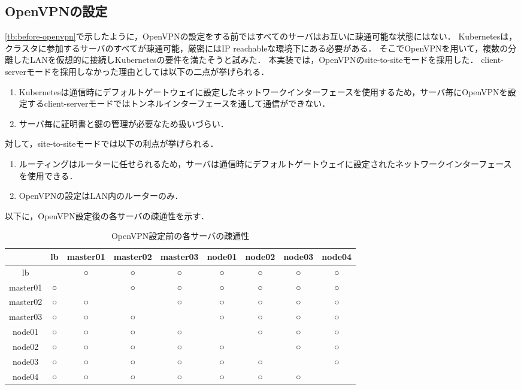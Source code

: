 \subsection{OpenVPNの設定}

\ref{tb:before-openvpn}で示したように，OpenVPNの設定をする前ではすべてのサーバはお互いに疎通可能な状態にはない．
Kubernetesは，クラスタに参加するサーバのすべてが疎通可能，厳密にはIP reachableな環境下にある必要がある．
そこでOpenVPNを用いて，複数の分離したLANを仮想的に接続しKubernetesの要件を満たそうと試みた．
本実装では，OpenVPNのsite-to-siteモードを採用した．
client-serverモードを採用しなかった理由としては以下の二点が挙げられる．

\begin{enumerate}
  \item Kubernetesは通信時にデフォルトゲートウェイに設定したネットワークインターフェースを使用するため，サーバ毎にOpenVPNを設定するclient-serverモードではトンネルインターフェースを通して通信ができない．
  \item サーバ毎に証明書と鍵の管理が必要なため扱いづらい．
\end{enumerate}

対して，site-to-siteモードでは以下の利点が挙げられる．

\begin{enumerate}
  \item ルーティングはルーターに任せられるため，サーバは通信時にデフォルトゲートウェイに設定されたネットワークインターフェースを使用できる．
  \item OpenVPNの設定はLAN内のルーターのみ．
\end{enumerate}

以下に，OpenVPN設定後の各サーバの疎通性を示す．

\begin{table}[htb]
  \begin{center}
    \caption{OpenVPN設定前の各サーバの疎通性}
    \begin{tabular}{|c|c|c|c|c|c|c|c|c|} \hline
      & lb & master01 & master02 & master03 & node01 & node02 & node03 & node04 \\ \hline
      lb & \ & ○ & ○ & ○ & ○ & ○ & ○ & ○ \\ \hline
      master01 & ○ & \ & ○ & ○ & ○ & ○ & ○ & ○ \\ \hline
      master02 & ○ & ○ & \ & ○ & ○ & ○ & ○ & ○ \\ \hline
      master03 & ○ & ○ & ○ & \ & ○ & ○ & ○ & ○ \\ \hline
      node01 & ○ & ○ & ○ & ○ & \ & ○ & ○ & ○ \\ \hline
      node02 & ○ & ○ & ○ & ○ & ○ & \ & ○ & ○ \\ \hline
      node03 & ○ & ○ & ○ & ○ & ○ & ○ & \ & ○ \\ \hline
      node04 & ○ & ○ & ○ & ○ & ○ & ○ & ○ & \ \\ \hline
    \end{tabular}
  \end{center}
\end{table}

